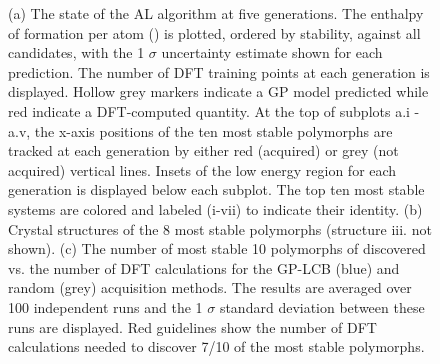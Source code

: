 \begin{figure}[!htb]
\centering
{}
\caption{\label{fig:iro3_al}
%
(a) The state of the AL algorithm at five generations.
%
The enthalpy of formation per atom (\DHf) is plotted, ordered by stability, against all \IrOthree candidates, with the 1 $\sigma$ uncertainty estimate shown for each prediction.
%
The number of DFT training points at each generation is displayed.
%
Hollow grey markers indicate a GP model predicted \DHf while red indicate a DFT-computed quantity.
%
At the top of subplots a.i - a.v, the x-axis positions of the ten most stable polymorphs are tracked at each generation by either red (acquired) or grey (not acquired) vertical lines.
%
Insets of the low energy region for each generation is displayed below each subplot.
%
The top ten most stable systems are colored and labeled (i-vii) to indicate their identity.
%
(b) Crystal structures of the \num{8} most stable \IrOthree polymorphs (structure iii. not shown).
%
%
(c) The number of most stable \num{10} polymorphs of \IrOthree discovered vs. the number of DFT calculations for the GP-LCB (blue) and random (grey) acquisition methods.
%
The results are averaged over \num{100} independent runs and the 1 $\sigma$ standard deviation between these runs are displayed.
%
Red guidelines show the number of DFT calculations needed to discover \num{7/10} of the most stable polymorphs.
}
\end{figure}


